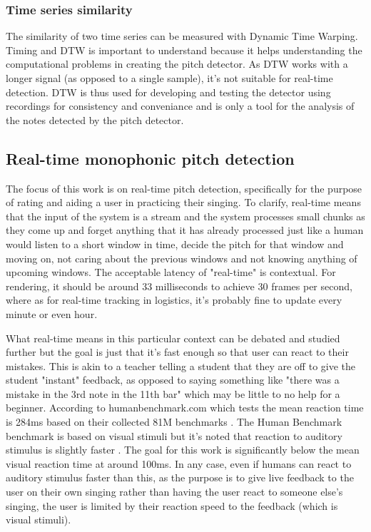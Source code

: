 \subsubsection{Time series similarity}
The similarity of two time series can be measured with Dynamic Time Warping. Timing and DTW is important to understand because it helps understanding the computational problems in creating the pitch detector. As DTW works with a longer signal (as opposed to a single sample), it's not suitable for real-time detection. DTW is thus used for developing and testing the detector using recordings for consistency and conveniance and is only a tool for the analysis of the notes detected by the pitch detector. 

\subsection{Real-time monophonic pitch detection}
The focus of this work is on real-time pitch detection, specifically for the purpose of rating and aiding a user in practicing their singing. To clarify, real-time means that the input of the system is a stream and the system processes small chunks as they come up and forget anything that it has already processed just like a human would listen to a short window in time, decide the pitch for that window and moving on, not caring about the previous windows and not knowing anything of upcoming windows. The acceptable latency of "real-time" is contextual. For rendering, it should be around 33 milliseconds to achieve 30 frames per second, where as for real-time tracking in logistics, it's probably fine to update every minute or even hour. 

What real-time means in this particular context can be debated and studied further but the goal is just that it's fast enough so that user can react to their mistakes. This is akin to a teacher telling a student that they are off to give the student "instant" feedback, as opposed to saying something like "there was a mistake in the 3rd note in the 11th bar" which may be little to no help for a beginner. According to humanbenchmark.com which tests the mean reaction time is 284ms based on their collected 81M benchmarks \cite{HumanBenchmark2025}. The Human Benchmark benchmark is based on visual stimuli but it's noted that reaction to auditory stimulus is slightly faster \cite{SheltonKumar2010}. The goal for this work is significantly below the mean visual reaction time at around 100ms. In any case, even if humans can react to auditory stimulus faster than this, as the purpose is to give live feedback to the user on their own singing rather than having the user react to someone else's singing, the user is limited by their reaction speed to the feedback (which is visual stimuli).

